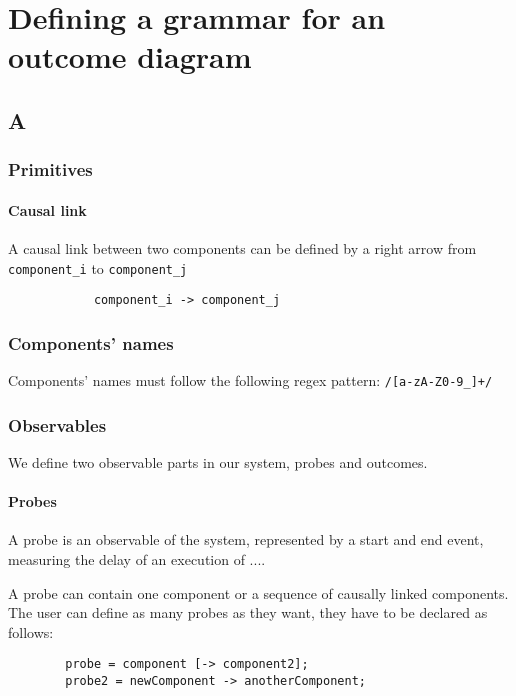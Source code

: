 \chapter{Defining a grammar for an outcome diagram}
    \section{A}
    \subsection{Primitives}
        \subsubsection{Causal link}
            A causal link between two components can be defined by a right arrow from \texttt{component\_i} to \texttt{component\_j}
        \begin{verbatim}
            component_i -> component_j 
        \end{verbatim}

        \subsection{Components' names}
            Components' names must follow the following regex pattern: \verb|/[a-zA-Z0-9_]+/|

    \subsection{Observables}
        We define two observable parts in our system, probes and outcomes.


    \subsubsection{Probes}
        A probe is an observable of the system, represented by a start and end event, measuring the delay of an execution of ....

        A probe can contain one component or a sequence of causally linked components. \\

        The user can define as many probes as they want, they have to be declared as follows:
   \begin{verbatim}
        probe = component [-> component2];
        probe2 = newComponent -> anotherComponent;
   \end{verbatim}

